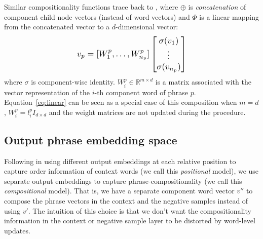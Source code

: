 \begin{table}
\centering
\begin{center}
\caption{\small{Statistics of phrase length distributions (m/million)}}
\label{tab:stats}
\end{center}
\end{table}
Similar compositionality functions trace back to , 
where $\oplus$ is \textit{concatenation} of component child node vectors (instead of word vectors) and $\Phi$ is a linear mapping from the
concatenated vector to a $d$-dimensional vector:
\begin{equation}
\resizebox{.45\hsize}{!}{$\displaystyle
v_p = [W_1^p,\ldots,W_{n_p}^p] \begin{bmatrix} \sigma(v_1) \\ \vdots \\ \sigma(v_{n_p}) \end{bmatrix}
$}
\end{equation}
where $\sigma$ is component-wise identity. $W_i^p \in {\mathbb{R}}^{m \times d}$ is a matrix associated with the vector representation of the $i$-th component word of
phrase $p$. 
Equation~\ref{eq:linear} can be seen as a special case of this composition when $m = d$, $W_i^p= l_i^p I_{d\times d}$ and the weight matrices are not updated during the procedure.

\subsection{Output phrase embedding space}
Following  in 
using different output embeddings at each relative position to capture order information of context words (we call this \textit{positional} model), 
we use separate output embeddings to capture phrase-compositionality (we call this \textit{compositional} model). That is, we have a separate component 
word vector $v''$ to compose the phrase vectors in the context 
and the negative samples instead of using $v'$.
The intuition of this choice is that we don't want the compositionality information in the context or negative sample layer 
to be distorted by word-level updates. 


